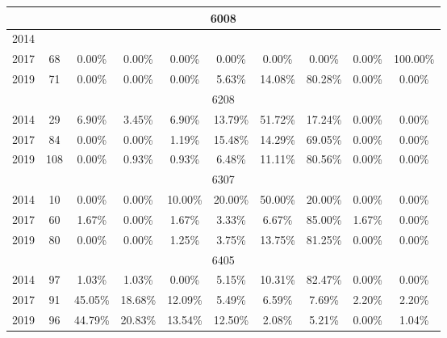 \begin{table}[H]
\begin{tabular}{|l|c|ccc|ccc|cc|}
\hline
\hline
\multicolumn{10}{|c|}{6008}\\
\hline
2014 & & & & & & & & & \\
2017 & 68 & 0.00\% & 0.00\% & 0.00\% & 0.00\% & 0.00\% & 0.00\% & 0.00\% & 100.00\%\\
2019 & 71 & 0.00\% & 0.00\% & 0.00\% & 5.63\% & 14.08\% & 80.28\% & 0.00\% & 0.00\%\\
\hline
\hline
\multicolumn{10}{|c|}{6208}\\
\hline
2014 & 29 & 6.90\% & 3.45\% & 6.90\% & 13.79\% & 51.72\% & 17.24\% & 0.00\% & 0.00\%\\
2017 & 84 & 0.00\% & 0.00\% & 1.19\% & 15.48\% & 14.29\% & 69.05\% & 0.00\% & 0.00\%\\
2019 & 108 & 0.00\% & 0.93\% & 0.93\% & 6.48\% & 11.11\% & 80.56\% & 0.00\% & 0.00\%\\
\hline
\hline
\multicolumn{10}{|c|}{6307}\\
\hline
2014 & 10 & 0.00\% & 0.00\% & 10.00\% & 20.00\% & 50.00\% & 20.00\% & 0.00\% & 0.00\%\\
2017 & 60 & 1.67\% & 0.00\% & 1.67\% & 3.33\% & 6.67\% & 85.00\% & 1.67\% & 0.00\%\\
2019 & 80 & 0.00\% & 0.00\% & 1.25\% & 3.75\% & 13.75\% & 81.25\% & 0.00\% & 0.00\%\\
\hline
\hline
\multicolumn{10}{|c|}{6405}\\
\hline
2014 & 97 & 1.03\% & 1.03\% & 0.00\% & 5.15\% & 10.31\% & 82.47\% & 0.00\% & 0.00\%\\
2017 & 91 & 45.05\% & 18.68\% & 12.09\% & 5.49\% & 6.59\% & 7.69\% & 2.20\% & 2.20\%\\
2019 & 96 & 44.79\% & 20.83\% & 13.54\% & 12.50\% & 2.08\% & 5.21\% & 0.00\% & 1.04\%\\
\hline
\bottomrule
\end{tabular}
\end{table}
